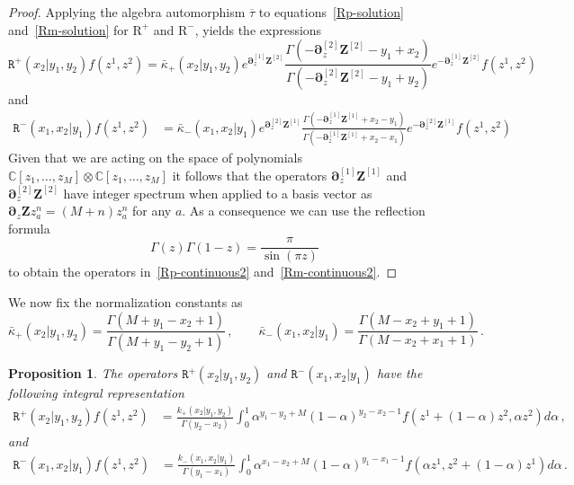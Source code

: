 \documentclass[11pt]{article}
\numberwithin{equation}{section}
\newtheorem{proposition}[theorem]{Proposition}
\newcommand{\M}{M}
\newcommand{\OT}{\bm{\partial}_z}
\newcommand{\OTD}{\bm{Z}}
\newcommand{\abrOSCR}{\mathrm{R}}
\newcommand{\ecdR}{\mathtt{R}}
\newcommand{\heat}{z}
\newcommand{\dualrep}{\overline{\tau}}
\begin{document}
\begin{proof}
 Applying the algebra automorphism $\dualrep $ to equations~\eqref{Rp-solution} and~\eqref{Rm-solution} for $\abrOSCR^{+}$ and $\abrOSCR^{-}$, yields the expressions
    \begin{equation}\label{Rp-continuous22}
			\ecdR ^+(x_2|y_1,y_2)f(\heat^{1},\heat^{2}) =\bar\kappa_+(x_2|y_1,y_2)e^{\OT^{[1]}\OTD^{[2]}}\frac{\Gamma(-\OT^{[2]}\OTD^{[2]}-y_1+x_2)}{\Gamma(-\OT^{[2]}\OTD^{[2]}-y_1+y_2)}e^{-\OT^{[1]}\OTD^{[2]}}f(\heat^{1},\heat^{2})
		\end{equation}
        and
    \begin{equation}\label{Rm-continuous22}
		\begin{split}
\ecdR ^{-}(x_{1},x_{2}|y_{1})f(\heat^{1},\heat^{2}
)&=\bar\kappa_-(x_{1},x_2|y_{1})e^{\OT^{[2]}\OTD^{[1]}}\frac{\Gamma\left(-\OT^{[1]}\OTD^{[1]}+x_{2}-y_{1}\right)}{\Gamma\left(-\OT^{[1]}\OTD^{[1]}+x_{2}-x_{1}\right)}e^{-\OT^{[2]}\OTD^{[1]}}f(\heat^{1},\heat^{2})
		\end{split}
	\end{equation}
Given that we are acting on the space of polynomials $\mathbb{C}[\heat_1,\ldots,\heat_M]\otimes \mathbb{C}[\heat_1,\ldots,\heat_M]$ it follows that the operators $\OT^{[1]}\OTD^{[1]}$ and $\OT^{[2]}\OTD^{[2]}$ have integer spectrum when applied to a basis vector as $\OT\OTD \heat_a^n=(M+n)\heat_a^n$ for any $a$. As a consequence we can use the reflection formula
	\begin{equation}
	 \Gamma(z)\Gamma(1-z)=\frac{\pi}{\sin(\pi z)}
	\end{equation}
to obtain the operators in~\eqref{Rp-continuous2} and~\eqref{Rm-continuous2}.
\end{proof}
We now fix the normalization constants as
 \begin{equation}\label{normali2}
		 				\bar\kappa_+(x_2|y_1,y_2)=\frac{\Gamma(M+y_1-x_2+1)}{\Gamma(M+y_1-y_2+1)}\,,\qquad
		 				\bar\kappa_-(x_1,x_2|y_1)=\frac{\Gamma(M-x_2+y_1+1)}{\Gamma(M-x_2+x_1+1)}\,.
		 			\end{equation}
\begin{proposition}
    The operators $\ecdR^{+}(x_2|y_1,y_2)$ and $\ecdR^{-}(x_1,x_2|y_1)$ have the following integral representation
   		\begin{equation}\label{redR2sl2int-dual}
			\begin{split}
				\ecdR ^+(x_2|y_1,y_2) f(\heat^{1},\heat^{2})&=                \frac{k_{+}(x_{2}|y_{1},y_{2})}{\Gamma(y_{2}-x_{2})}\int_{0}^{1}\alpha^{y_{1}-y_{2}+\M}(1-\alpha)^{y_{2}-x_{2}-1}f(\heat^1+(1-\alpha)\heat^{2},\alpha \heat^{2})d\alpha\,,
			\end{split}
		\end{equation}
		and
		\begin{equation}\label{redR2sl2int2-dual}
			\begin{split}
				\ecdR ^-(x_1,x_2|y_1) f(\heat^{1},\heat^{2})&=                \frac{k_{-}(x_{1},x_{2}|y_{1})}{\Gamma(y_{1}-x_{1})}\int_{0}^{1}\alpha^{x_{1}-x_{2}+\M}(1-\alpha)^{y_{1}-x_{1}-1}f(\alpha \heat^{1},\heat^{2}+(1-\alpha)\heat^{1})d\alpha\,.
			\end{split}
		\end{equation}
\end{proposition}
\end{document}
